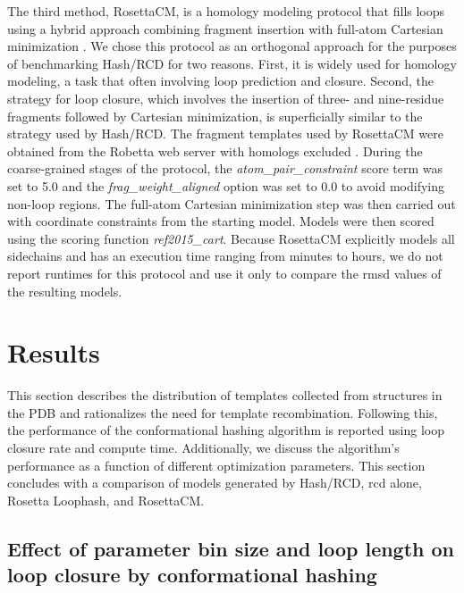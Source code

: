 The third method, RosettaCM, is a homology modeling protocol that fills loops using a hybrid approach combining fragment insertion with full-atom Cartesian minimization \citep*{Song2013}. We chose this protocol as an orthogonal approach for the purposes of benchmarking Hash/RCD for two reasons. First, it is widely used for homology modeling, a task that often involving loop prediction and closure. Second, the strategy for loop closure, which involves the insertion of three- and nine-residue fragments followed by Cartesian minimization, is superficially similar to the strategy used by Hash/RCD. The fragment templates used by RosettaCM were obtained from the Robetta web server with homologs excluded \citep*{Kim2004}. During the coarse-grained stages of the protocol, the \emph{atom\_pair\_constraint} score term was set to 5.0 and the \emph{frag\_weight\_aligned} option was set to 0.0 to avoid modifying non-loop regions. The full-atom Cartesian minimization step was then carried out with coordinate constraints from the starting model. Models were then scored using the scoring function \emph{ref2015\_cart}. Because RosettaCM explicitly models all sidechains and has an execution time ranging from minutes to hours, we do not report runtimes for this protocol and use it only to compare the \gls{rmsd} values of the resulting models.

\section{Results}

This section describes the distribution of templates collected from structures in the PDB and rationalizes the need for template recombination. Following this, the performance of the conformational hashing algorithm is reported using loop closure rate and compute time. Additionally, we discuss the algorithm's performance as a function of different optimization parameters. This section concludes with a comparison of models generated by Hash/RCD, \gls{rcd} alone, Rosetta Loophash, and RosettaCM.

\subsection{Effect of parameter bin size and loop length on loop closure by conformational hashing}

